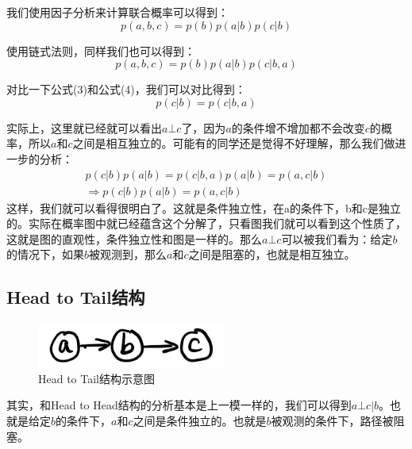 \documentclass[a4paper]{article}
\begin{document}
我们使用因子分析来计算联合概率可以得到：
\begin{equation}
    p(a,b,c) = p(b)p(a|b)p(c|b)
\end{equation}

使用链式法则，同样我们也可以得到：
\begin{equation}
    p(a,b,c) = p(b)p(a|b)p(c|b,a)
\end{equation}

对比一下公式(3)和公式(4)，我们可以对比得到：
\begin{equation}
    p(c|b)=p(c|b,a)
\end{equation}

实际上，这里就已经就可以看出$a\bot c$了，因为$a$的条件增不增加都不会改变$c$的概率，所以$a$和$c$之间是相互独立的。可能有的同学还是觉得不好理解，那么我们做进一步的分析：
\begin{gather}
    p(c|b)p(a|b) = p(c|b,a)p(a|b) = p(a,c|b) \\ 
    \Rightarrow p(c|b)p(a|b) = p(a,c|b)
\end{gather}
这样，我们就可以看得很明白了。这就是条件独立性，在a的条件下，b和c是独立的。实际在概率图中就已经蕴含这个分解了，只看图我们就可以看到这个性质了，这就是图的直观性，条件独立性和图是一样的。那么$a\bot c$可以被我们看为：给定$b$的情况下，如果$b$被观测到，那么$a$和$c$之间是阻塞的，也就是相互独立。

\subsection{Head to Tail结构}
\begin{figure}[H]
    \centering
    \includegraphics[width=.35\textwidth]{微信图片_20191124103526.png}
    \caption{Head to Tail结构示意图}
    \label{fig:my_label_1}
\end{figure}

其实，和Head to Head结构的分析基本是上一模一样的，我们可以得到$a\bot c|b$。也就是给定$b$的条件下，$a$和$c$之间是条件独立的。也就是$b$被观测的条件下，路径被阻塞。
\end{document}
